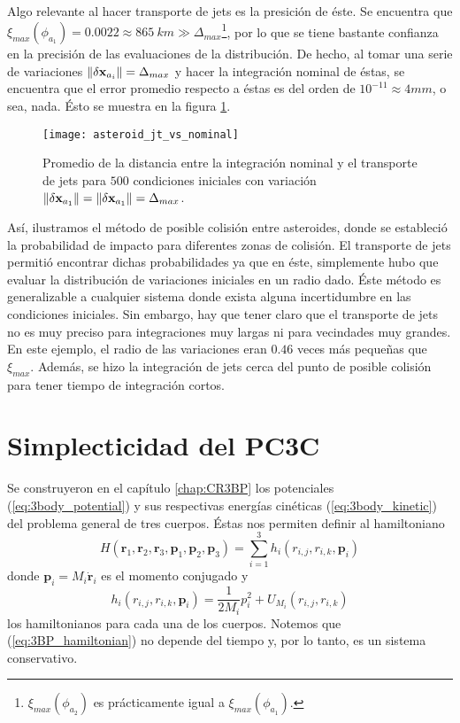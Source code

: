 Algo relevante al hacer transporte de jets es la presición de éste. Se encuentra que $\xi_{max}(\phi_{a_1}) = 0.0022 \approx 865 \ km \gg \Delta_{max}$\footnote{$\xi_{max}(\phi_{a_2})$ es prácticamente igual a $\xi_{max}(\phi_{a_1})$.}, por lo que se tiene bastante confianza en la precisión de las evaluaciones de la distribución. De hecho, al tomar una serie de variaciones $\left\lVert\delta\mathbf{x}_{a_i}\right\rVert = \Delta_{max}$ y hacer la integración nominal de éstas, se encuentra que el error promedio respecto a éstas es del orden de $10^{-11} \approx 4 mm$, o sea, nada. Ésto se muestra en la figura \ref{fig:asteroid_jt_vs_nominal}.

\begin{figure}
 \centering
 \texttt{[image: asteroid\_jt\_vs\_nominal]}
 \caption{Promedio de la distancia entre la integración nominal y el transporte de jets para $500$ condiciones iniciales con variación $\left\lVert\delta\mathbf{x}_{a_1}\right\rVert = \left\lVert\delta\mathbf{x}_{a_1}\right\rVert = \Delta_{max}$.}
 \label{fig:asteroid_jt_vs_nominal}
\end{figure}

Así, ilustramos el método de posible colisión entre asteroides, donde se estableció la probabilidad de impacto para diferentes zonas de colisión. El transporte de jets permitió encontrar dichas probabilidades ya que en éste, simplemente hubo que evaluar la distribución de variaciones iniciales en un radio dado. Éste método es generalizable a cualquier sistema donde exista alguna incertidumbre en las condiciones iniciales. Sin embargo, hay que tener claro que el transporte de jets no es muy preciso para integraciones muy largas ni para vecindades muy grandes. En este ejemplo, el radio de las variaciones eran $0.46$ veces más pequeñas que $\xi_{max}$. Además, se hizo la integración de jets cerca del punto de posible colisión para tener tiempo de integración cortos. 


\section{Simplecticidad del PC3C}
Se construyeron en el capítulo \ref{chap:CR3BP} los potenciales (\ref{eq:3body_potential}) y sus respectivas energías cinéticas (\ref{eq:3body_kinetic}) del problema general de tres cuerpos. Éstas nos permiten definir al hamiltoniano
\begin{equation}
 H(\mathbf{r}_1, \mathbf{r}_2, \mathbf{r}_3, \mathbf{p}_1, \mathbf{p}_2, \mathbf{p}_3) = \sum_{i=1}^3 h_i(r_{i,j}, r_{i,k}, \mathbf{p}_i)
 \label{eq:3BP_hamiltonian}
\end{equation} 
donde $\mathbf{p}_i = M_i \dot{\mathbf{r}}_i$ es el momento conjugado y
\begin{equation}
 h_i(r_{i,j}, r_{i,k}, \mathbf{p}_i) = \frac{1}{2 M_i} p_i^2 + U_{M_i}(r_{i,j}, r_{i,k})
 \label{eq:individual_hamiltonian}
\end{equation}
los hamiltonianos para cada una de los cuerpos. Notemos que (\ref{eq:3BP_hamiltonian}) no depende del tiempo y, por lo tanto, es un sistema conservativo. 

